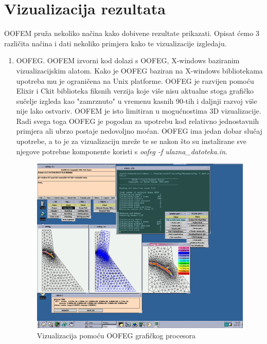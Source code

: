 \documentclass[a4paper,twoside,12pt]{memoir} %
\begin{document}
\section{Vizualizacija rezultata}
OOFEM pruža nekoliko načina kako dobivene rezultate prikazati. Opisat ćemo 3 različita načina i dati nekoliko primjera kako te vizualizacije izgledaju.
\begin{enumerate}
    \item OOFEG. OOFEM izvorni kod dolazi s OOFEG, X-windows baziranim vizualizacijskim alatom. Kako je OOFEG baziran na X-windows bibliotekama upotreba mu je ograničena na Unix platforme. OOFEG je razvijen pomoću Elixir i Ckit biblioteka fiksnih verzija koje više nisu aktualne stoga grafičko sučelje izgleda kao "zamrznuto" u vremenu kasnih 90-tih i daljnji razvoj više nije lako ostvariv. OOFEM je isto limitiran u mogućnostima 3D vizualizacije. Radi svega toga OOFEG je pogodan za upotrebu kod relativno jednostavnih primjera ali ubrzo postaje nedovoljno moćan. OOFEG ima jedan dobar slučaj upotrebe, a to je za vizualizaciju mreže te se nakon što su instalirane sve njegove potrebne komponente koristi s \textit{oofeg -f ulazna\_datoteka.in}. 
        \begin{figure}[h!t]
        \begin{center}
        \includegraphics[scale=0.3]{pictures/chapter_oofem/oofeg_koyna_dam.png}
        \caption{Vizualizacija pomoću OOFEG grafičkog procesora \cite{oofem-web}}
        \label{fig:oofeg_example}
        \end{center}
        \end{figure}

\end{enumerate}
\end{document}
